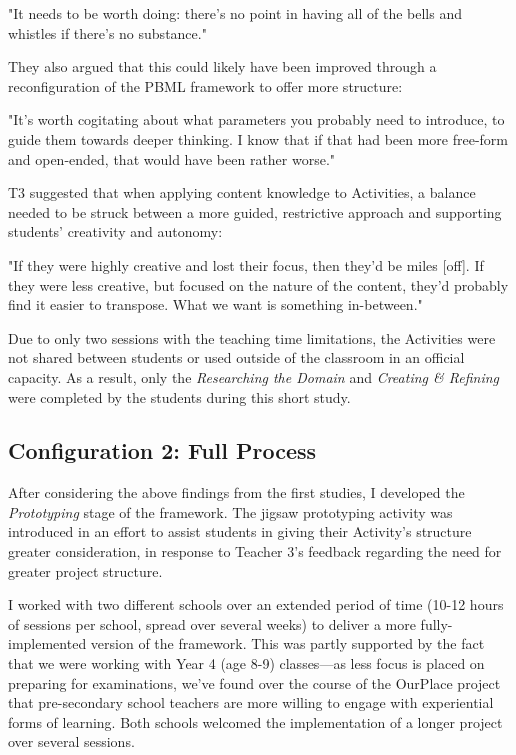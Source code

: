 \begin{displayquote}
"It needs to be worth doing: there's no point in having all of the bells and whistles if there's no substance."
\end{displayquote}

They also argued that this could likely have been improved through a reconfiguration of the PBML framework to offer more structure: 

\begin{displayquote}
"It's worth cogitating about what parameters you probably need to introduce, to guide them towards deeper thinking. I know that if that had been more free-form and open-ended, that would have been rather worse."
\end{displayquote}

T3 suggested that when applying content knowledge to Activities, a balance needed to be struck between a more guided, restrictive approach and supporting students' creativity and autonomy:

\begin{displayquote}
"If they were highly creative and lost their focus, then they'd be miles [off]. If they were less creative, but focused on the nature of the content, they'd probably find it easier to transpose. What we want is something in-between."
\end{displayquote}

Due to only two sessions with the teaching time limitations, the Activities were not shared between students or used outside of the classroom in an official capacity. As a result, only the \textit{Researching the Domain} and \textit{Creating \& Refining} were completed by the students during this short study.

\subsection{Configuration 2: Full Process}

After considering the above findings from the first studies, I developed the \textit{Prototyping} stage of the framework. The jigsaw prototyping activity was introduced in an effort to assist students in giving their Activity's structure greater consideration, in response to Teacher 3's feedback regarding the need for greater project structure.

I worked with two different schools over an extended period of time (10-12 hours of sessions per school, spread over several weeks) to deliver a more fully-implemented version of the framework. This was partly supported by the fact that we were working with Year 4 (age 8-9) classes---as less focus is placed on preparing for examinations, we've found over the course of the OurPlace project that pre-secondary school teachers are more willing to engage with experiential forms of learning. Both schools welcomed the implementation of a longer project over several sessions.

